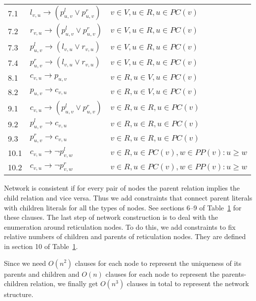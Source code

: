 \documentclass[runningheads, envcountsame, a4paper]{llncs}
\begin{document}
\begin{table}[t]
\begin{tabular}{l | l | l}
  \hline
  7.1 &
  $l_{v,u} \rightarrow (p^l_{u,v} \vee p^r_{u,v})$ &
  $v \in V, u \in R, u \in PC(v)$
  \\
  7.2 &
  $r_{v,u} \rightarrow (p^l_{u,v} \vee p^r_{u,v})$ &
  $v \in V, u \in R, u \in PC(v)$
  \\
  7.3 &
  $p^l_{u,v} \rightarrow (l_{v,u} \vee r_{v,u})$ &
  $v \in V, u \in R, u \in PC(v)$
  \\
  7.4 &
  $p^r_{u,v} \rightarrow (l_{v,u} \vee r_{v,u})$ &
  $v \in V, u \in R, u \in PC(v)$
  \\
  
  \hline 
  8.1 &
  $c_{v,u} \rightarrow p_{u,v}$ &
  $v \in R, u \in V, u \in PC(v)$
  \\
  8.2 &
  $p_{u,v} \rightarrow c_{v,u}$ &
  $v \in R, u \in V, u \in PC(v)$
  \\
  
  \hline
  9.1 &
  $c_{v,u} \rightarrow (p^l_{u,v} \vee p^r_{u,v})$ &
  $v \in R, u \in R, u \in PC(v)$
  \\
  9.2 &
  $p^l_{u,v} \rightarrow c_{v,u}$ &
  $v \in R, u \in R, u \in PC(v)$
  \\
  9.3 &
  $p^r_{u,v} \rightarrow c_{v,u}$ &
  $v \in R, u \in R, u \in PC(v)$
  \\
  
  \hline
  10.1 &
  $c_{v,u} \rightarrow \neg p^l_{v,w}$ &
  $v \in R, u \in PC(v), w \in PP(v): u \geq w$
  \\
  10.2 &
  $c_{v,u} \rightarrow \neg p^r_{v,w}$ &
  $v \in R, u \in PC(v), w \in PP(v): u \geq w$
  \\
  
\end{tabular}
\label{network-table}
\end{table}

Network is consistent if for every pair of nodes the parent relation implies the child relation and vice versa. Thus we add constraints that connect parent literals with children literals for all the types of nodes. See sections 6--9 of Table~\ref{network-table} for these clauses.
The last step of network construction is to deal with the enumeration around reticulation nodes. To do this, we add constraints to fix 
relative numbers of children and parents of reticulation nodes. They are defined in section 10 of Table~\ref{network-table}.

Since we need $O(n^2)$ clauses for each node to represent the uniqueness of its parents and children 
and $O(n)$ clauses for each node to represent the parents-children relation, we finally get $O(n^3)$ clauses in total 
to represent the network structure.
\end{document}
